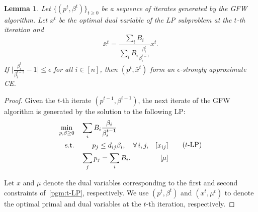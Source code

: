 \documentclass[format=acmsmall,authorversion]{acmart}
\newtheorem{lemma}[theorem]{Lemma}
\begin{document}
\begin{lemma} 
    Let $\{(p^t, \beta^t)\}_{t \geq 0}$ be a sequence of iterates generated by the GFW algorithm. 
    Let $x^t$ be the optimal dual variable of the LP subproblem at the $t$-th iteration and 
    \begin{equation*} 
        \bar{x}^t = \frac{\sum_i B_i}{\sum_i B_i \frac{\beta^t_i}{\beta^{t-1}_i}} x^t. 
    \end{equation*} 
    If $\big\lvert \frac{\beta^t_i}{\beta^{t-1}_i} - 1 \big\rvert \leq \epsilon$ for all $i \in [n]$, then $(p^t, \bar{x}^t)$ form an $\epsilon$-strongly approximate CE. 
    \label{lem:eps-approxi} 
\end{lemma} 
\begin{proof} 
    Given the $t$-th iterate $(p^{t-1}, \beta^{t-1})$, the next iterate of the GFW algorithm is generated by the solution to the following LP: 
    \begin{equation} 
        \begin{aligned}
            \min_{p, \beta \geq 0} \quad & \sum_i B_i \frac{\beta_i}{\beta^{t-1}_i} &  \\ 
            \textnormal{s.t.} \quad & \quad\;\; p_j \leq d_{ij} \beta_i, \quad \forall\, i, j, & [x_{ij}] \\ 
            & \sum_j p_j = \sum_i B_i. & [\mu] \\ 
        \end{aligned} 
        \tag{$t$-LP} 
        \label{pgm:t-LP}
    \end{equation} 
    
    Let 
    $x$ and $\mu$ denote the dual variables corresponding to the first and second constraints of~\cref{pgm:t-LP}, respectively. 
    We use $(p^t, \beta^t)$ and $(x^t, \mu^t)$ to denote the optimal primal and dual variables at the $t$-th iteration, respectively.  


\end{proof}
\end{document}
